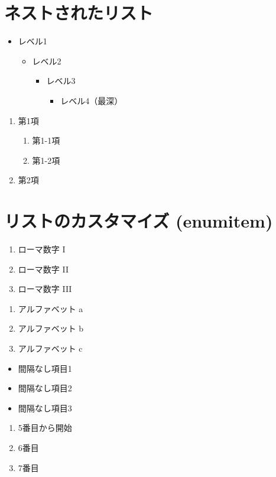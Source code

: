 \documentclass[lualatex,ja=standard]{bxjsarticle}
\begin{document}
\section{ネストされたリスト}

\begin{itemize}
  \item レベル1
    \begin{itemize}
      \item レベル2
        \begin{itemize}
          \item レベル3
            \begin{itemize}
              \item レベル4（最深）
            \end{itemize}
        \end{itemize}
    \end{itemize}
\end{itemize}

\begin{enumerate}
  \item 第1項
    \begin{enumerate}
      \item 第1-1項
      \item 第1-2項
    \end{enumerate}
  \item 第2項
\end{enumerate}

\section{リストのカスタマイズ (enumitem)}

\begin{enumerate}[label=\Roman*.]
  \item ローマ数字 I
  \item ローマ数字 II
  \item ローマ数字 III
\end{enumerate}

\begin{enumerate}[label=(\alph*)]
  \item アルファベット a
  \item アルファベット b
  \item アルファベット c
\end{enumerate}

\begin{itemize}[noitemsep]
  \item 間隔なし項目1
  \item 間隔なし項目2
  \item 間隔なし項目3
\end{itemize}

\begin{enumerate}[start=5]
  \item 5番目から開始
  \item 6番目
  \item 7番目
\end{enumerate}
\end{document}
